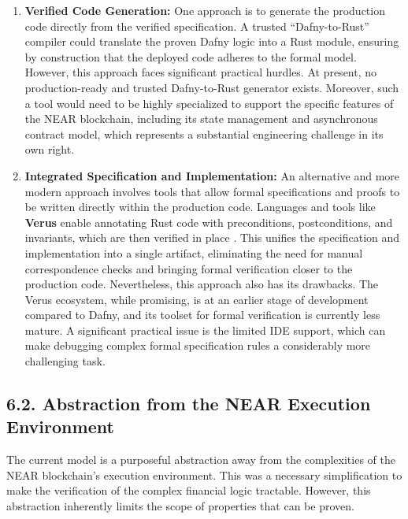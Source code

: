 \documentclass[
  english,
  onecolumn]{article}
\begin{document}
\begin{enumerate}
\def\labelenumi{\arabic{enumi}.}
\item
  \textbf{Verified Code Generation:} One approach is to generate the
  production code directly from the verified specification. A trusted
  ``Dafny-to-Rust'' compiler could translate the proven Dafny logic into
  a Rust module, ensuring by construction that the deployed code adheres
  to the formal model. However, this approach faces significant
  practical hurdles. At present, no production-ready and trusted
  Dafny-to-Rust generator exists. Moreover, such a tool would need to be
  highly specialized to support the specific features of the NEAR
  blockchain, including its state management and asynchronous contract
  model, which represents a substantial engineering challenge in its own
  right.
\item
  \textbf{Integrated Specification and Implementation:} An alternative
  and more modern approach involves tools that allow formal
  specifications and proofs to be written directly within the production
  code. Languages and tools like \textbf{Verus} enable annotating Rust
  code with preconditions, postconditions, and invariants, which are
  then verified in place \citep{mok2022verus}. This unifies the
  specification and implementation into a single artifact, eliminating
  the need for manual correspondence checks and bringing formal
  verification closer to the production code. Nevertheless, this
  approach also has its drawbacks. The Verus ecosystem, while promising,
  is at an earlier stage of development compared to Dafny, and its
  toolset for formal verification is currently less mature. A
  significant practical issue is the limited IDE support, which can make
  debugging complex formal specification rules a considerably more
  challenging task.
\end{enumerate}

\subsection{6.2. Abstraction from the NEAR Execution
Environment}\label{abstraction-from-the-near-execution-environment}

The current model is a purposeful abstraction away from the complexities
of the NEAR blockchain's execution environment. This was a necessary
simplification to make the verification of the complex financial logic
tractable. However, this abstraction inherently limits the scope of
properties that can be proven.
\end{document}
